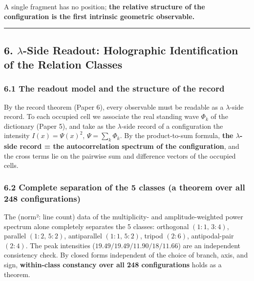\documentclass[
]{article}
\begin{document}
A single fragment has no position; \textbf{the relative structure of the
configuration is the first intrinsic geometric observable.}

\begin{center}\rule{0.5\linewidth}{0.5pt}\end{center}

\subsection{\texorpdfstring{6. \(\lambda\)-Side Readout: Holographic
Identification of the Relation
Classes}{6. \textbackslash lambda-Side Readout: Holographic Identification of the Relation Classes}}\label{lambda-side-readout-holographic-identification-of-the-relation-classes}

\subsubsection{6.1 The readout model and the structure of the
record}\label{the-readout-model-and-the-structure-of-the-record}

By the record theorem (Paper 6), every observable must be readable as a
\(\lambda\)-side record. To each occupied cell we associate the real
standing wave \(\Phi_k\) of the dictionary (Paper 5), and take as the
\(\lambda\)-side record of a configuration the intensity
\(I(x)=\Psi(x)^2\), \(\Psi=\sum_{k}\Phi_k\). By the product-to-sum
formula, \textbf{the \(\lambda\)-side record = the autocorrelation
spectrum of the configuration}, and the cross terms lie on the pairwise
sum and difference vectors of the occupied cells.

\subsubsection{6.2 Complete separation of the 5 classes (a theorem over
all 248
configurations)}\label{complete-separation-of-the-5-classes-a-theorem-over-all-248-configurations}

The (norm²: line count) data of the multiplicity- and amplitude-weighted
power spectrum alone completely separates the 5 classes: orthogonal
\((1{:}1,\,3{:}4)\), parallel \((1{:}2,\,5{:}2)\), antiparallel
\((1{:}1,\,5{:}2)\), tripod \((2{:}6)\), antipodal-pair \((2{:}4)\). The
peak intensities (\(19.49/19.49/11.90/18/11.66\)) are an independent
consistency check. By closed forms independent of the choice of branch,
axis, and sign, \textbf{within-class constancy over all 248
configurations} holds as a theorem.
\end{document}
